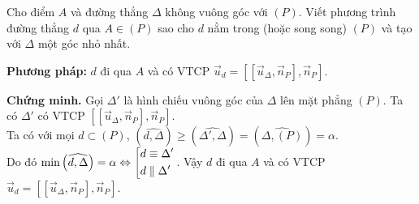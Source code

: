 \begin{dang}{}
	{Cho điểm $ A $ và đường thẳng $ \Delta $ không vuông góc với $ (P) $. Viết phương trình đường thẳng $ d $  qua $ A\in(P) $ sao cho $ d $ nằm trong (hoặc song song) $ (P) $ và tạo với $ \Delta $ một góc nhỏ nhất.}
	
	\textbf{Phương pháp:} 
	$ d $ đi qua $ A $ và có VTCP $ \overrightarrow{u}_d=\left[\left[\overrightarrow{u}_\Delta,\overrightarrow{n}_P\right],\overrightarrow{n}_P\right] $.
	
	\textbf{Chứng minh.}
	Gọi $ \Delta' $ là hình chiếu vuông góc của $ \Delta $ lên mặt phẳng $ (P) $. Ta có $ \Delta' $ có VTCP $\left[\left[\overrightarrow{u}_\Delta,\overrightarrow{n}_P\right],\overrightarrow{n}_P\right] $.\\
	Ta có với mọi $ d\subset(P) $, $ \left(\widehat{d,\Delta}\right)\ge \left(\widehat{\Delta',\Delta}\right) = \left(\widehat{\Delta,(P)}\right)=\alpha$.\\
	Do đó $ \min\left(\widehat{d,\Delta}\right)=\alpha\Leftrightarrow \left[\begin{aligned}&d\equiv\Delta'\\&d\parallel \Delta'\end{aligned}\right. $.
	Vậy $ d $ đi qua $ A $ và có VTCP $ \overrightarrow{u}_d=\left[\left[\overrightarrow{u}_\Delta,\overrightarrow{n}_P\right],\overrightarrow{n}_P\right] $.
\end{dang}

